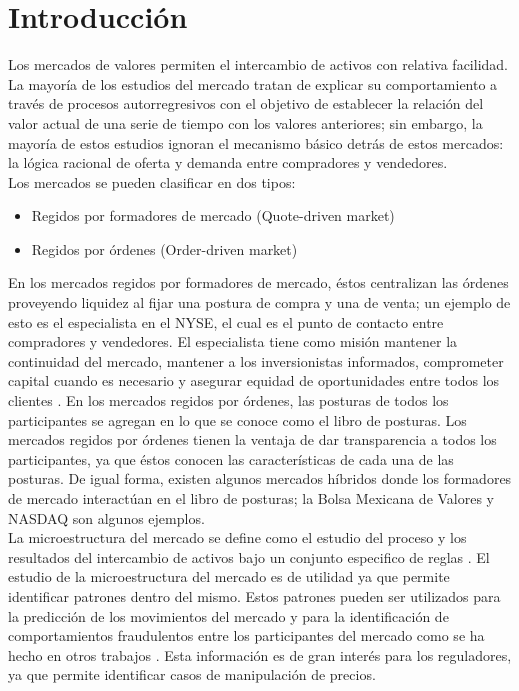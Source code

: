 \documentclass[11pt]{article}
\numberwithin{equation}{section} %
\begin{document}
\thispagestyle{empty}
\tableofcontents
\clearpage

\setcounter{page}{1}

\section{Introducción}

Los mercados de valores permiten el intercambio de activos con relativa facilidad. La mayoría de los estudios del mercado tratan de explicar su comportamiento a través de procesos autorregresivos con el objetivo de establecer la relación del valor actual de una serie de tiempo con los valores anteriores; sin embargo, la mayoría de estos estudios ignoran el mecanismo básico detrás de estos mercados: la lógica racional de oferta y demanda entre compradores y vendedores.\\

Los mercados se pueden clasificar en dos tipos:
\begin{itemize}
  \item Regidos por formadores de mercado (Quote-driven market)
  \item Regidos por órdenes (Order-driven market)
\end{itemize}

En los mercados regidos por formadores de mercado, éstos centralizan las órdenes proveyendo liquidez al fijar una postura de compra y una de venta; un ejemplo de esto es el especialista en el NYSE, el cual es el punto de contacto entre compradores y vendedores. El especialista tiene como misión mantener la continuidad del mercado, mantener a los inversionistas informados, comprometer capital cuando es necesario y asegurar equidad de oportunidades entre todos los clientes \cite{nyse}. En los mercados regidos por órdenes, las posturas de todos los participantes se agregan en lo que se conoce como el libro de posturas. Los mercados regidos por órdenes tienen la ventaja de dar transparencia a todos los participantes, ya que éstos conocen las características de cada una de las posturas. De igual forma, existen algunos mercados híbridos donde los formadores de mercado interactúan en el libro de posturas; la Bolsa Mexicana de Valores y NASDAQ son algunos ejemplos.\\

La microestructura del mercado se define como el estudio del proceso y los resultados del intercambio de activos bajo un conjunto especifico de reglas \cite{1995market}. El estudio de la microestructura del mercado es de utilidad ya que permite identificar patrones dentro del mismo. Estos patrones pueden ser utilizados para la predicción de los movimientos del mercado y para la identificación de comportamientos fraudulentos entre los participantes del mercado como se ha hecho en otros trabajos \cite{manipulation}. Esta información es de gran interés para los reguladores, ya que permite identificar casos de manipulación de precios.
\\
\end{document}
